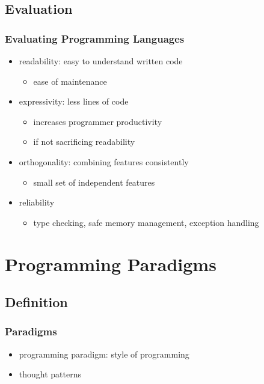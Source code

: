 \documentclass[dvipsnames]{beamer}
\theoremstyle{plain}
\begin{document}
\subsection{Evaluation}

\begin{frame}
  \frametitle{Evaluating Programming Languages}

  \begin{itemize}
    \item \alert{readability}: easy to understand written code
    \begin{itemize}
      \item ease of maintenance
    \end{itemize}

    \pause
    \medskip
    \item \alert{expressivity}: less lines of code
    \begin{itemize}
      \item increases programmer productivity
      \item if not sacrificing readability
    \end{itemize}

    \pause
    \medskip
    \item \alert{orthogonality}: combining features consistently
    \begin{itemize}
      \item small set of independent features
    \end{itemize}

    \pause
    \medskip
    \item \alert{reliability}
    \begin{itemize}
      \item type checking, safe memory management, exception handling
    \end{itemize}
  \end{itemize}
\end{frame}

\section{Programming Paradigms}

\subsection{Definition}

\begin{frame}
  \frametitle{Paradigms}

  \begin{itemize}
    \item programming paradigm: style of programming
    \item thought patterns
  \end{itemize}
\end{frame}
\end{document}
